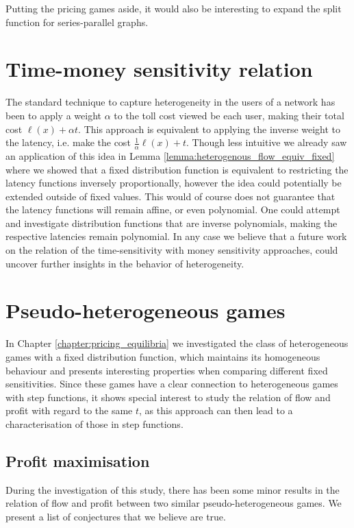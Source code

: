 \documentclass[10pt,a4paper]{book}
\theoremstyle{definition}
\theoremstyle{comment}
\begin{document}
Putting the pricing games aside, it would also be interesting to expand the split function for series-parallel graphs.

\section*{Time-money sensitivity relation}

The standard technique to capture heterogeneity in the users of a network has been to apply a weight $\alpha$ to the toll cost viewed be each user, making their total cost $\ell(x) + \alpha t$.
This approach is equivalent to applying the inverse weight to the latency, i.e. make the cost $\tfrac1\alpha \ell(x) + t$.
Though less intuitive we already saw an application of this idea in Lemma \ref{lemma:heterogenous_flow_equiv_fixed} where we showed that a fixed distribution function is equivalent to restricting the latency functions inversely proportionally, however the idea could potentially be extended outside of fixed values.
This would of course does not guarantee that the latency functions will remain affine, or even polynomial.
One could attempt and investigate distribution functions that are inverse polynomials, making the respective latencies remain polynomial.
In any case we believe that a future work on the relation of the time-sensitivity with money sensitivity approaches, could uncover further insights in the behavior of heterogeneity.

\section*{Pseudo-heterogeneous games}

In Chapter \ref{chapter:pricing_equilibria} we investigated the class of heterogeneous games with a fixed distribution function, which maintains its homogeneous behaviour and presents interesting properties when comparing different fixed sensitivities.
Since these games have a clear connection to heterogeneous games with step functions, it shows special interest to study the relation of flow and profit with regard to the same $t$, as this approach can then lead to a characterisation of those in step functions.

\subsection*{Profit maximisation}

During the investigation of this study, there has been some minor results in the relation of flow and profit between two similar pseudo-heterogeneous games.
We present a list of conjectures that we believe are true.
\end{document}

